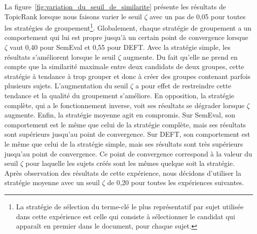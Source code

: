     La figure~\ref{fig:variation_du_seuil_de_similarite} présente les résultats
    de TopicRank lorsque nous faisons varier le seuil $\zeta$ avec un pas de
    0,05 pour toutes les stratégies de groupement\footnote{La stratégie de
    sélection du terme-clé le plus représentatif par sujet utilisée dans cette
    expérience est celle qui consiste à sélectionner le candidat qui apparaît en
    premier dans le document, pour chaque sujet.}.
    Globalement, chaque stratégie de groupement a un comportement qui lui est
    propre jusqu'à un certain point de convergence lorsque $\zeta$ vaut 0,40
    pour SemEval et 0,55 pour DEFT. Avec la stratégie simple, les résultats
    s'améliorent lorsque le seuil $\zeta$ augmente. Du fait qu'elle ne prend en
    compte que la similarité maximale entre deux candidats de deux groupes,
    cette stratégie à tendance à trop grouper et donc à créer des groupes
    contenant parfois plusieurs sujets. L'augmentation du seuil $\zeta$ a pour
    effet de restreindre cette tendance et la qualité du groupement s'améliore.
    En opposition, la stratégie complète, qui a le fonctionnement inverse, voit
    ses résultats se dégrader lorsque $\zeta$ augmente. Enfin, la stratégie
    moyenne agit en compromis. Sur SemEval, son comportement est le même que
    celui de la stratégie complète, mais ses résultats sont supérieurs jusqu'au
    point de convergence. Sur DEFT, son comportement est le même que celui de la
    stratégie simple, mais ses résultats sont très supérieurs jusqu'au point de
    convergence. Ce point de convergence correspond à la valeur du seuil $\zeta$
    pour laquelle les sujets créés sont les mêmes quelque soit la stratégie.
    Après observation des résultats de cette expérience, nous décidons
    d'utiliser la stratégie moyenne avec un seuil $\zeta$ de 0,20 pour toutes
    les expériences suivantes.

